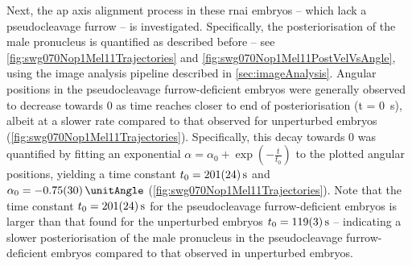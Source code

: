 Next, the \ac{ap} axis alignment process in these  \ac{rnai} embryos -- which lack a pseudocleavage furrow -- is investigated. Specifically, the posteriorisation of the male pronucleus is quantified as described before -- see \autoref{fig:swg070Nop1Mel11Trajectories} and \autoref{fig:swg070Nop1Mel11PostVelVsAngle}, using the image analysis pipeline described in \autoref{sec:imageAnalysis}. Angular positions in the pseudocleavage furrow-deficient embryos were generally observed to decrease towards \SI{0}{\unitAngle} as time reaches closer to end of posteriorisation (t = \SI{0}{\second}), albeit at a slower rate compared to that observed for unperturbed embryos (\autoref{fig:swg070Nop1Mel11Trajectories}). Specifically, this decay towards \SI{0}{\unitAngle} was quantified by fitting an exponential $\alpha = \alpha_0 + \exp(-\frac{t}{t_0})$ to the plotted angular positions, yielding a time constant $t_0 = \SI{201 +- 24}{\second}$ and $\alpha_0 = \SI{-0.75 +- 0.3}{\unitAngle}$ (\autoref{fig:swg070Nop1Mel11Trajectories}). Note that the time constant $t_0 = \SI{201 +- 24}{\second}$ for the pseudocleavage furrow-deficient embryos is larger than that found for the unperturbed embryos $t_0 = \SI{119 +- 3}{\second}$ -- indicating a slower posteriorisation of the male pronucleus in the pseudocleavage furrow-deficient embryos compared to that observed in unperturbed embryos. 

